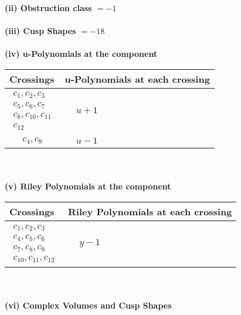 \documentclass[1p]{elsarticle_modified}
\theoremstyle{definition}
\begin{document}
\flushleft \textbf{(ii) Obstruction class $= -1$}\\~\\
\flushleft \textbf{(iii) Cusp Shapes $= -18$}\\~\\
\newpage\renewcommand{\arraystretch}{1}
\flushleft \textbf{(iv) u-Polynomials at the component}\newline \\
\begin{tabular}{m{50pt}|m{274pt}}
Crossings & \hspace{64pt}u-Polynomials at each crossing \\
\hline $$\begin{aligned}c_{1},c_{2},c_{3}\\c_{5},c_{6},c_{7}\\c_{8},c_{10},c_{11}\\c_{12}\end{aligned}$$&$\begin{aligned}
&u+1
\end{aligned}$\\
\hline $$\begin{aligned}c_{4},c_{9}\end{aligned}$$&$\begin{aligned}
&u-1
\end{aligned}$\\
\hline
\end{tabular}\\~\\
\newpage\renewcommand{\arraystretch}{1}
\flushleft \textbf{(v) Riley Polynomials at the component}\newline \\
\begin{tabular}{m{50pt}|m{274pt}}
Crossings & \hspace{64pt}Riley Polynomials at each crossing \\
\hline $$\begin{aligned}c_{1},c_{2},c_{3}\\c_{4},c_{5},c_{6}\\c_{7},c_{8},c_{9}\\c_{10},c_{11},c_{12}\end{aligned}$$&$\begin{aligned}
&y-1
\end{aligned}$\\
\hline
\end{tabular}\\~\\
\newpage\flushleft \textbf{(vi) Complex Volumes and Cusp Shapes}
\end{document}

